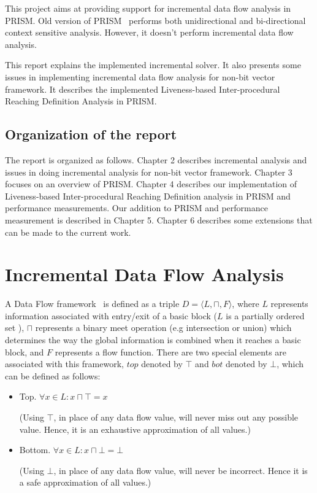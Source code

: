 \documentclass[11pt,a4paper,openright]{report}
\begin{document}
This project aims at providing support for incremental data flow analysis in PRISM.
Old version of PRISM~\cite{thesis_v} performs both unidirectional and bi-directional context sensitive analysis. 
However, it doesn't perform incremental data flow analysis.

This report explains the implemented incremental solver. It also presents some issues in implementing incremental data flow analysis for non-bit vector
framework. It describes the implemented Liveness-based Inter-procedural Reaching Definition Analysis in PRISM.




\section{Organization of the report}
The report is organized as follows. Chapter 2 describes incremental analysis and issues in doing incremental analysis for non-bit vector framework.
Chapter 3 focuses on an overview of PRISM. Chapter 4 describes our implementation of Liveness-based Inter-procedural Reaching Definition analysis in 
PRISM and performance measurements. Our addition to PRISM and performance measurement is described in Chapter 5. Chapter 6 describes some extensions
that can be made to the current work. 


\chapter{Incremental Data Flow Analysis}
A Data Flow framework~\cite{thesis_sir} is defined as a triple $D =\langle L,\sqcap,F\rangle$, where $L$ represents information associated 
with entry/exit of a basic block ($L$ is a partially ordered set ), $\sqcap$ represents a binary meet operation (e.g intersection or union) 
which determines the way the global information is combined when it reaches a basic block, and $F$ represents a flow function. 
There are two special elements are associated with this framework, $top$ denoted by $\top$ and $bot$ denoted by $\bot$, 
which can be defined as follows:
\begin{itemize}
\item {Top.}
$\forall x \in L : x \sqcap \top = x $ 

(Using $\top$, in place of any data flow value, will never miss out any possible value. Hence, it is an exhaustive approximation of all values.)

\item {Bottom.}
$\forall x \in L : x \sqcap \bot =\bot $

(Using $\bot$, in place of any data flow value, will never be incorrect. Hence it is a safe approximation of all values.)


\end{itemize}
\end{document}
